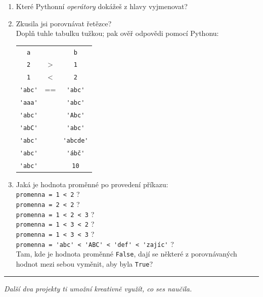 \documentclass[a4paper,10pt]{article}
\newcommand\True{\texttt{True}}
\newcommand\False{\texttt{False}}
\newcommand\startsection[1]{
     \vspace{0.2ex}
    \hrule
    {\fontspec{Oxygen} \tiny
     \vspace{-1ex}
     \emph{#1}
     \vspace{-1.5em}
    }
}
\begin{document}
\begin{enumerate}[resume]

\item Které Pythonní \emph{operátory} dokážeš z hlavy vyjmenovat?

\item Zkusila jsi porovnávat řetězce?
    \\Doplň tuhle tabulku tužkou; pak ověř odpovědi pomocí Pythonu:

    {
        \newcommand\rowend{\rule{0pt}{0.5cm}\\ \hline}
        \begin{tabular}{c|c|c}
        \arrayrulecolor{silver}
        \verb+a+ &  & \verb+b+ \\
        \arrayrulecolor{black}\hline\arrayrulecolor{silver}
        \verb+2+ & > & \verb+1+ \rowend
        \verb+1+ & < & \verb+2+ \rowend
        \verb+'abc'+ & == & \verb+'abc'+ \rowend
        \verb+'aaa'+ &    & \verb+'abc'+ \rowend
        \verb+'abc'+ &    & \verb+'Abc'+ \rowend
        \verb+'abC'+ &    & \verb+'abc'+ \rowend
        \verb+'abc'+ &    & \verb+'abcde'+ \rowend
        \verb+'abc'+ &    & \verb+'ábč'+ \rowend
        \verb+'abc'+ &    & \verb+10+ \rowend
        \end{tabular}
    }

\item Jaká je hodnota proměnné po provedení příkazu:
    \\\verb+promenna = 1 < 2+ \hspace{0.2cm}?
    \\\verb+promenna = 2 < 2+ \hspace{0.2cm}?
    \\\verb+promenna = 1 < 2 < 3+ \hspace{0.2cm}?
    \\\verb+promenna = 1 < 3 < 2+ \hspace{0.2cm}?
    \\\verb+promenna = 1 < 3 < 3+ \hspace{0.2cm}?
    \\\verb+promenna = 'abc' < 'ABC' < 'def' < 'zajíc'+ \hspace{0.2cm}?
    \\Tam, kde je hodnota proměnné \False, dají se některé z porovnávaných
    hodnot mezi sebou vyměnit, aby byla \True?

\end{enumerate}

\startsection{Další dva projekty ti umožní kreativně využít, co ses naučila.}
\end{document}
